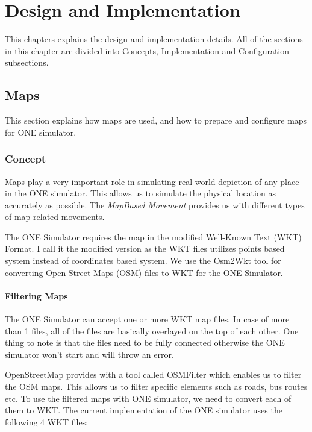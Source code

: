 
\chapter{Design and Implementation}\label{chapter:design_and_implementation}
This chapters explains the design and implementation details. All of the sections in this chapter are divided into Concepts, Implementation and Configuration subsections.
\section{Maps}
This section explains how maps are used, and how to prepare and configure maps for ONE simulator.
	\subsection{Concept}
	Maps play a very important role in simulating real-world depiction of any place in the ONE simulator. This allows us to simulate the physical location as accurately as possible. The \textit{MapBased Movement} provides us with different types of map-related movements.

	The ONE Simulator requires the map in the modified Well-Known Text (WKT) Format. I call it the modified version as the WKT files utilizes points based system instead of coordinates based system. We use the Osm2Wkt tool\cite{mayer2010osm} for converting Open Street Maps (OSM) files to WKT for the ONE Simulator.

	\subsubsection {Filtering Maps}
	The ONE Simulator can accept one or more WKT map files. In case of more than 1 files, all of the files are basically overlayed on the top of each other. One thing to note is that the files need to be fully connected otherwise the ONE simulator won't start and will throw an error.

	OpenStreetMap provides with a tool called OSMFilter \cite{osm-filter} which enables us to filter the OSM maps. This allows us to filter specific elements such as roads, bus routes etc. To use the filtered maps with ONE simulator, we need to convert each of them to WKT.
	The current implementation of the ONE simulator uses the following 4 WKT files:

